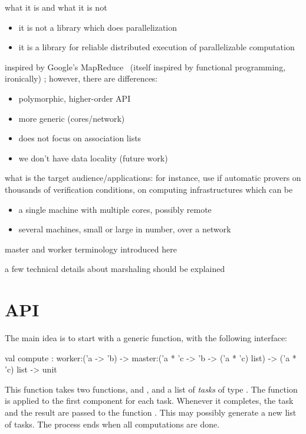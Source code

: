 \documentclass[preprint]{sigplanconf}
\begin{document}
what it is and what it is not
\begin{itemize}
\item it is not a library which does parallelization
\item it is a library for reliable distributed execution of
  parallelizable computation 
\end{itemize}

inspired by Google's MapReduce~\cite{mapreduce} (itself inspired by functional
programming, ironically) ;  however, there are differences:
\begin{itemize}
\item polymorphic, higher-order API
\item more generic (cores/network)
\item does not focus on association lists
\item we don't have data locality (future work)
\end{itemize}

what is the target audience/applications: 
for instance, use if automatic provers on thousands of verification
conditions, on computing infrastructures which can be
\begin{itemize}
\item a single machine with multiple cores, possibly remote
\item several machines, small or large in number, over a network
\end{itemize}

master and worker terminology introduced here

a few technical details about marshaling should be explained

\section{API}\label{sec:API}

The main idea is to start with a generic function, with the
following interface: 
\begin{ocaml}
  val compute : 
    worker:('a -> 'b) -> 
    master:('a * 'c -> 'b -> ('a * 'c) list) -> 
    ('a * 'c) list -> unit
\end{ocaml}
This function takes two functions,  and , and a
list of \emph{tasks} of type .
The function  is applied to the first component for each task.
Whenever it completes, the task and the result are passed to the
function . This may possibly generate a new list of
tasks. The process ends when all computations are done.
\end{document}
